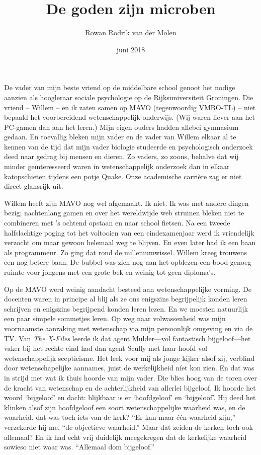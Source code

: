 \documentclass[12pt,a4paper]{article}
\begin{document}
\title{De goden zijn microben}
\author{Rowan Rodrik van der Molen}
\date{juni 2018}
\maketitle


De vader van mijn beste vriend op de middelbare school genoot het nodige aanzien als hoogleraar sociale psychologie op de Rijksuniversiteit Groningen. Die vriend – Willem – en ik zaten samen op MAVO (tegenwoordig VMBO-TL) – niet bepaald het voorbereidend wetenschappelijk onderwijs. (Wij waren liever aan het PC-gamen dan aan het leren.) Mijn eigen ouders hadden allebei gymnasium gedaan. En toevallig bleken mijn vader en de vader van Willem elkaar al te kennen van de tijd dat mijn vader biologie studeerde en psychologisch onderzoek deed naar gedrag bij mensen en dieren. Zo vaders, zo zoons, behalve dat wij minder geïnteresseerd waren in wetenschappelijk onderzoek dan in elkaar katopschieten tijdens een potje Quake. Onze academische carrière zag er niet direct glansrijk uit.

Willem heeft zijn MAVO nog wel afgemaakt. Ik niet. Ik was met andere dingen bezig; nachtenlang gamen en over het wereldwijde web struinen bleken niet te combineren met 's ochtend opstaan en naar school fietsen. Na een tweede halfslachtige poging tot het voltooien van een eindexamenjaar werd ik vriendelijk verzocht om maar gewoon helemaal weg te blijven. En even later had ik een baan als programmeur. Zo ging dat rond de milleniumwissel. Willem kreeg trouwens een nog betere baan. De bubbel was zich nog aan het opblezen een bood genoeg ruimte voor jongens met een grote bek en weinig tot geen diploma's.

Op de MAVO werd weinig aandacht besteed aan wetenschappelijke vorming. De docenten waren in principe al blij als ze ons enigszins begrijpelijk konden leren schrijven en enigszins begrijpend konden leren lezen. En we moesten natuurlijk een paar simpele sommetjes leren. Op weg naar volwassenheid was mijn voornaamste aanraking met wetenschap via mijn persoonlijk omgeving en via de TV. Van \emph{The X-Files} leerde ik dat agent Mulder—vol fantastisch bijgeloof—het vaker bij het rechte eind had dan agent Scully met haar hoofd vol wetenschappelijk scepticisme. Het leek voor mij als jonge kijker alsof zij, verblind door wetenschapelijke aannames, juist de werkelijkheid níet kon zien. En dat was in strijd met wat ik thuis hoorde van mijn vader. Die blies hoog van de toren over de kracht van wetenschap en de achterlijkheid van allerlei bijgeloof. Ik hoorde het woord ‘bijgeloof’ en dacht: blijkbaar is er ‘hoofdgeloof’ en ‘bijgeloof’. Hij deed het klinken alsof zijn hoofdgeloof een soort wetenschappelijke waarheid was, en de waarheid, dat was toch iets van de kerk? “Er kan maar één waarheid zijn,” verzekerde hij me, “de objectieve waarheid.” Maar dat zeiden de kerken toch ook allemaal? En ik had echt vrij duidelijk meegekregen dat de kerkelijke waarheid sowieso niet waar was. “Allemaal dom bijgeloof.”
\end{document}
